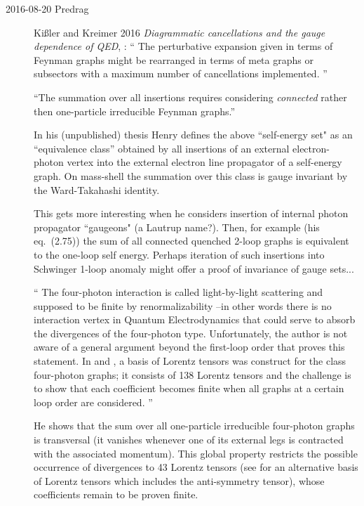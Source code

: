 \begin{description}
\item[2016-08-20 Predrag]
Ki{\ss}ler and Kreimer 2016
{\em Diagrammatic cancellations and the gauge dependence of {QED}},
 :
``
The perturbative expansion given in terms of Feynman graphs might be
rearranged in terms of meta graphs or subsectors with a maximum number of
cancellations implemented.
''

``The summation over all insertions requires considering \emph{connected}
rather then one-particle irreducible Feynman graphs.''

In his (unpublished) thesis Henry defines the above ``self-energy set" as
an ``equivalence class'' obtained by all insertions of an external
electron-photon vertex into the external electron line propagator of a
self-energy graph. On mass-shell the summation over this class is gauge
invariant by the Ward-Takahashi identity.

This gets more interesting when he considers insertion of internal
photon propagator ``gaugeons" (a Lautrup name?). Then, for example
(his eq.~(2.75)) the sum of all connected quenched 2-loop graphs
is equivalent to the one-loop self energy. Perhaps iteration of
such insertions into Schwinger 1-loop anomaly might offer a proof
of invariance of gauge sets...

``
The four-photon interaction is called light-by-light scattering and
supposed to be finite by renormalizability --in other words there is no
interaction vertex in Quantum Electrodynamics that could serve to absorb
the divergences of the four-photon type. Unfortunately, the author is not
aware of a general argument beyond the first-loop order that proves this
statement. In  and , a basis of
Lorentz tensors was construct for the class four-photon graphs; it
consists of 138 Lorentz tensors and the challenge is to show that each
coefficient becomes finite when all graphs at a certain loop order are
considered.
''

He  shows that the sum over all one-particle irreducible four-photon
graphs is transversal (it vanishes whenever one of its external legs is
contracted with the associated momentum). This global property restricts
the possible occurrence of divergences to 43 Lorentz tensors (see
 for an alternative basis of Lorentz tensors which
includes the anti-symmetry tensor), whose coefficients remain to be
proven finite.


\end{description}
